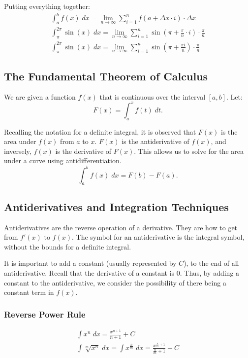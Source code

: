 \documentclass[12pt]{article}
\begin{document}
\noindent Putting everything together:
\begin{gather*}
	\int_a^b f(x) \; dx = \lim_{n \to \infty} \sum_{i = 1}^n f(a + \Delta x \cdot i) \cdot \Delta x \\[5pt]
	\int_\pi^{2 \pi} \sin(x) \; dx = \lim_{n \to \infty} \sum_{i = 1}^n \sin \left( \pi + \frac{\pi}{n} \cdot i \right) \cdot \frac{\pi}{n} \\[5pt]
	\int_\pi^{2 \pi} \sin(x) \; dx = \lim_{n \to \infty} \sum_{i = 1}^n \sin \left( \pi + \frac{\pi i}{n} \right) \cdot \frac{\pi}{n}
\end{gather*}

\subsection{The Fundamental Theorem of Calculus}
We are given a function $f(x)$ that is continuous over the interval $[a, b]$. Let:
\[ F(x) = \int_a^x f(t) \; dt. \]

Recalling the notation for a definite integral, it is observed that $F(x)$ is the area under $f(x)$ from $a$ to $x$. $F(x)$ is the antiderivative of $f(x)$, and inversely, $f(x)$ is the derivative of $F(x)$. This allows us to solve for the area under a curve using antidifferentiation.
\[ \int_a^b f(x) \; dx = F(b) - F(a). \]

\subsection{Antiderivatives and Integration Techniques}
Antiderivatives are the reverse operation of a derivative. They are how to get from $f'(x)$ to $f(x)$. The symbol for an antiderivative is the integral symbol, without the bounds for a definite integral.

It is important to add a constant (usually represented by $C$), to the end of all antiderivative. Recall that the derivative of a constant is $0$. Thus, by adding a constant to the antiderivative, we consider the possibility of there being a constant term in $f(x)$.

\subsubsection{Reverse Power Rule}
\begin{gather*}
	\int x^n \; dx = \frac{x^{n + 1}}{n + 1} + C \\[5pt]
	\int \sqrt[m]{x^n} \; dx = \int x^{\frac{n}{m}} \; dx = \frac{x^{\frac{n}{m} + 1}}{\frac{n}{m} + 1} + C
\end{gather*}
\end{document}

